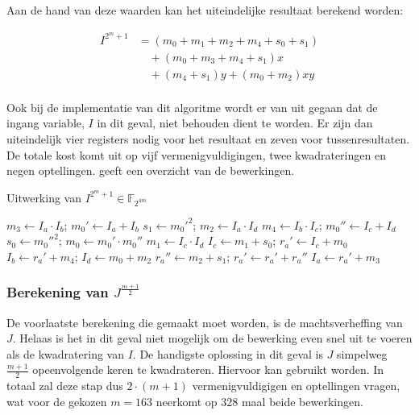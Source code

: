 Aan de hand van deze waarden kan het uiteindelijke resultaat berekend worden:

\[\begin{aligned}
I^{2^m + 1}	&= (m_0 + m_1 + m_2 + m_4 + s_0 + s_1)\\
				&\quad + (m_0 + m_3 + m_4 + s_1) x \\
				&\quad + (m_4 + s_1) y + (m_0 + m_2) xy\\
\end{aligned}\]

Ook bij de implementatie van dit algoritme wordt er van uit gegaan dat de ingang variable, $I$ in dit geval, niet behouden dient te worden. Er zijn dan uiteindelijk vier registers nodig voor het resultaat en zeven voor tussenresultaten. De totale kost komt uit op vijf vermenigvuldigingen, twee kwadrateringen en negen optellingen.  geeft een overzicht van de bewerkingen.


\begin{algorithm}[h]
	\caption{Uitwerking van $I^{2^m + 1} \in \mathbb{F}_{2^{4m}}$}
	\label{algoritme-implementatie-miller-v-power}
	$m_3 \leftarrow I_a \cdot I_b$; $m_0' \leftarrow I_a + I_b$\;
	$s_1 \leftarrow m_0'^2$; $m_2 \leftarrow I_a \cdot I_d$\;
	$m_4 \leftarrow I_b \cdot I_c$; $m_0'' \leftarrow I_c + I_d$\;
	$s_0 \leftarrow m_0''^2$; $m_0 \leftarrow m_0' \cdot m_0''$\;
	$m_1 \leftarrow I_c \cdot I_d$\;
	$I_c \leftarrow m_1 + s_0$; $r_a' \leftarrow I_c + m_0$\;
	$I_b \leftarrow r_a' + m_4$; $I_d \leftarrow m_0 + m_2$\;
	$r_a'' \leftarrow m_2 + s_1$; $r_a' \leftarrow r_a' + r_a''$\;
	$I_a \leftarrow r_a' + m_3$\;
\end{algorithm}

\subsubsection{Berekening van $J^{\frac{m + 1}{2}}$}

De voorlaatste berekening die gemaakt moet worden, is de machtsverheffing van $J$. Helaas is het in dit geval niet mogelijk om de bewerking even snel uit te voeren als de kwadratering van $I$. De handigste oplossing in dit geval is $J$ simpelweg $\frac{m + 1}{2}$ opeenvolgende keren te kwadrateren. Hiervoor kan  gebruikt worden. In totaal zal deze stap dus $2 \cdot (m + 1)$ vermenigvuldigigen en optellingen vragen, wat voor de gekozen $m = 163$ neerkomt op 328 maal beide bewerkingen.

